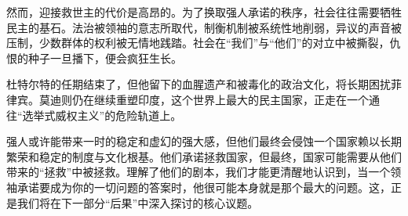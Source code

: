 然而，迎接救世主的代价是高昂的。为了换取强人承诺的秩序，社会往往需要牺牲民主的基石。法治被领袖的意志所取代，制衡机制被系统性地削弱，异议的声音被压制，少数群体的权利被无情地践踏。社会在``我们''与``他们''的对立中被撕裂，仇恨的种子一旦播下，便会疯狂生长。

杜特尔特的任期结束了，但他留下的血腥遗产和被毒化的政治文化，将长期困扰菲律宾。莫迪则仍在继续重塑印度，这个世界上最大的民主国家，正走在一个通往``选举式威权主义''的危险轨道上。

强人或许能带来一时的稳定和虚幻的强大感，但他们最终会侵蚀一个国家赖以长期繁荣和稳定的制度与文化根基。他们承诺拯救国家，但最终，国家可能需要从他们带来的``拯救''中被拯救。理解了他们的剧本，我们才能更清醒地认识到，当一个领袖承诺要成为你的一切问题的答案时，他很可能本身就是那个最大的问题。这，正是我们将在下一部分``后果''中深入探讨的核心议题。